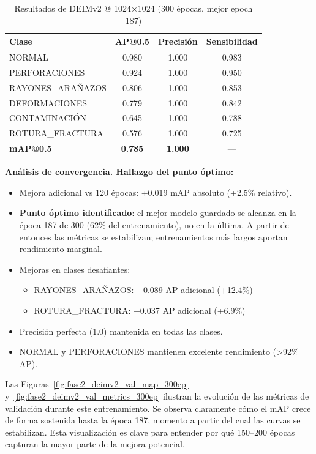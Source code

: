 \begin{table}[htbp]
\centering
\begin{tabular}{lccc}
\toprule
\textbf{Clase} & \textbf{AP@0.5} & \textbf{Precisión} & \textbf{Sensibilidad} \\
\midrule
NORMAL & 0.980 & 1.000 & 0.983 \\
PERFORACIONES & 0.924 & 1.000 & 0.950 \\
\mbox{RAYONES\_ARAÑAZOS} & 0.806 & 1.000 & 0.853 \\
DEFORMACIONES & 0.779 & 1.000 & 0.842 \\
CONTAMINACIÓN & 0.645 & 1.000 & 0.788 \\
\mbox{ROTURA\_FRACTURA} & 0.576 & 1.000 & 0.725 \\
\midrule
\textbf{mAP@0.5} & \textbf{0.785} & \textbf{1.000} & --- \\
\bottomrule
\end{tabular}
\caption{Resultados de DEIMv2 @ 1024×1024 (300 épocas, mejor epoch 187)}
\label{tab:deimv2_1024_300ep}
\end{table}

\textbf{Análisis de convergencia. Hallazgo del punto óptimo:}
\begin{itemize}
    \item Mejora adicional vs 120 épocas: +0.019 mAP absoluto (+2.5\% relativo).
    \item \textbf{Punto óptimo identificado}: el mejor modelo guardado se alcanza en la época 187 de 300 (62\% del entrenamiento), no en la última. A partir de entonces las métricas se estabilizan; entrenamientos más largos aportan rendimiento marginal.
    \item Mejoras en clases desafiantes:
    \begin{itemize}
        \item \mbox{RAYONES\_ARAÑAZOS}: +0.089 AP adicional (+12.4\%)
        \item \mbox{ROTURA\_FRACTURA}: +0.037 AP adicional (+6.9\%)
    \end{itemize}
    \item Precisión perfecta (1.0) mantenida en todas las clases.
    \item NORMAL y PERFORACIONES mantienen excelente rendimiento (>92\% AP).
\end{itemize}

Las Figuras~\ref{fig:fase2_deimv2_val_map_300ep} y~\ref{fig:fase2_deimv2_val_metrics_300ep} ilustran la evolución de las métricas de validación durante este entrenamiento. Se observa claramente cómo el mAP crece de forma sostenida hasta la época 187, momento a partir del cual las curvas se estabilizan. Esta visualización es clave para entender por qué 150--200 épocas capturan la mayor parte de la mejora potencial.

